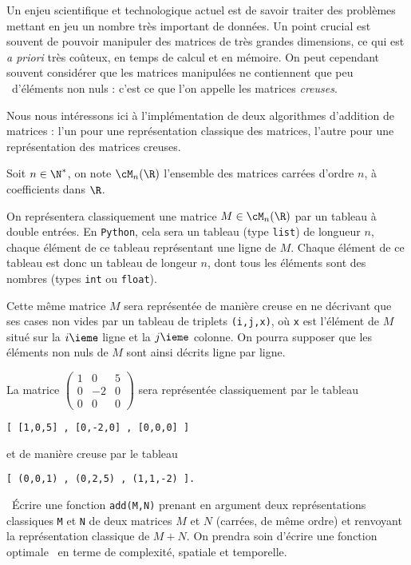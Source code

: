 \exer{}
\setcounter{numques}{0}

Un enjeu scientifique et technologique actuel est de savoir traiter des problèmes mettant en jeu un nombre très important de données.
Un point crucial est souvent de pouvoir manipuler des matrices de très grandes dimensions, ce qui est \emph{a priori} très coûteux, en temps de calcul et en mémoire. 
On peut cependant souvent considérer que les matrices manipulées ne contiennent que \og peu \fg\ d'éléments non nuls : c'est ce que l'on appelle les matrices \emph{creuses}. 

Nous nous intéressons ici à l'implémentation de deux algorithmes d'addition de matrices : l'un pour une représentation classique des matrices, l'autre pour une représentation des matrices creuses.

Soit $n\in\N^\ast$, on note $\cM_n(\R)$ l'ensemble des matrices carrées d'ordre $n$, à coefficients dans $\R$.  

On représentera classiquement une matrice $M\in \cM_n(\R)$ par un tableau à double entrées. 
En \texttt{Python}, cela sera un tableau (type \texttt{list}) de longueur $n$, chaque élément de ce tableau représentant une ligne de $M$.
Chaque élément de ce tableau est donc un tableau de longeur $n$, dont tous les éléments sont des nombres (types \texttt{int} ou \texttt{float}).

Cette même matrice $M$ sera représentée de manière creuse en ne décrivant que ses cases non vides par un tableau de triplets \texttt{(i,j,x)}, où \texttt{x} est l'élément de $M$ situé sur la $i\ieme$ ligne et la $j\ieme$ colonne. 
On pourra supposer que les éléments non nuls de $M$ sont ainsi décrits ligne par ligne. 

\begin{exemple}
  La matrice $\begin{pmatrix} 1&0&5 \\ 0&-2&0 \\ 0&0&0 \end{pmatrix}$ sera représentée classiquement par le tableau 
\begin{verbatim}
[ [1,0,5] , [0,-2,0] , [0,0,0] ]
\end{verbatim}
et de manière creuse par le tableau 
\begin{verbatim}
[ (0,0,1) , (0,2,5) , (1,1,-2) ].
\end{verbatim}
\end{exemple}

\question\ \'Ecrire une fonction \texttt{add(M,N)} prenant en argument deux représentations classiques \texttt{M} et \texttt{N} de deux matrices $M$ et $N$ (carrées, de même ordre) et renvoyant la représentation classique de $M+N$. 
On prendra soin d'écrire une fonction \og optimale \fg\ en terme de complexité, spatiale et temporelle. 

